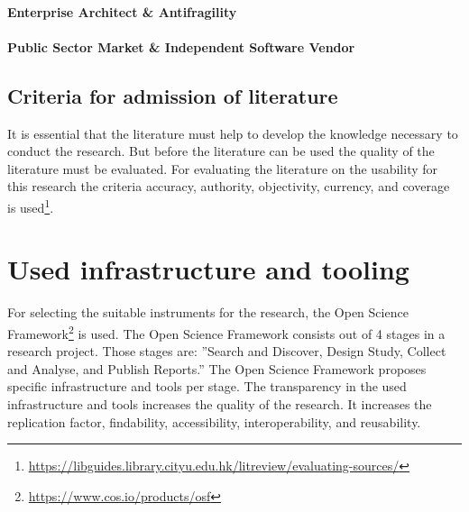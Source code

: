\paragraph{Enterprise Architect \& Antifragility}


\paragraph{Public Sector Market \& Independent Software Vendor}

\subsection{Criteria for admission of literature}
It is essential that the literature must help to develop the knowledge necessary to conduct the research. But before the literature can be used the quality of the literature must be evaluated. For evaluating the literature on the usability for this research the criteria accuracy, authority, objectivity, currency, and coverage is used\footnote{\url{https://libguides.library.cityu.edu.hk/litreview/evaluating-sources/}}.



\section{Used infrastructure and tooling}
For selecting the suitable instruments for the research, the Open Science Framework\footnote{\url{https://www.cos.io/products/osf}} is used. The Open Science Framework consists out of 4 stages in a research project. Those stages are: ''Search and Discover, Design Study, Collect and Analyse, and Publish Reports.'' The Open Science Framework proposes specific infrastructure and tools per stage. The transparency in the used infrastructure and tools increases the quality of the research. It increases the replication factor, findability, accessibility, interoperability, and reusability.
